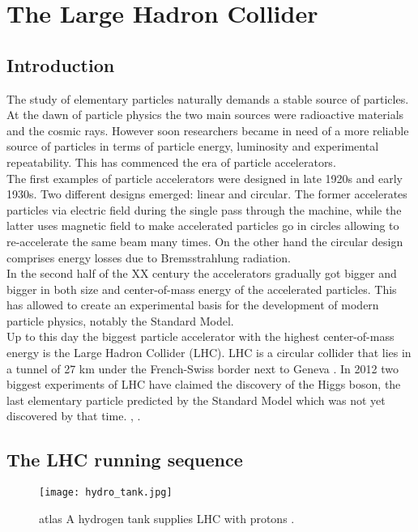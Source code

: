 \chapter{The Large Hadron Collider}
    
   
        
    \section{Introduction}
    
        The study of elementary particles naturally demands a stable source of particles. At the dawn of particle physics the two main sources were radioactive materials and the cosmic rays. However soon researchers became in need of a more reliable source of particles in terms of particle energy, luminosity and experimental repeatability. This has commenced the era of particle accelerators.\\
        The first examples of particle accelerators were designed in late 1920s and early 1930s. Two different designs emerged: linear and circular. The former accelerates particles via electric field during the single pass through the machine, while the latter uses magnetic field to make accelerated particles go in circles allowing to re-accelerate the same beam many times. On the other hand the circular design comprises energy losses due to Bremsstrahlung radiation.\\
        In the second half of the XX century the accelerators gradually got bigger and bigger in both size and center-of-mass energy of the accelerated particles. This has allowed to create an experimental basis for the development of modern particle physics, notably the Standard Model.\\
        Up to this day the biggest particle accelerator with the highest center-of-mass energy is the Large Hadron Collider (LHC). LHC is a circular collider that lies in a tunnel of 27 km under the French-Swiss border next to Geneva \cite{Bruening}. In 2012 two biggest experiments of LHC have claimed the discovery of the Higgs boson, the last elementary particle predicted by the Standard Model which was not yet discovered by that time. \cite{higgs_atlas}, \cite{higgs_cms}.
        
        \section{The LHC running sequence}
                   \begin{figure}[htpb]
        	\texttt{[image: hydro\_tank.jpg]}
        	\caption{ \gls{atlas} A hydrogen tank supplies LHC with protons \cite{hydro}.}
        	\label{fig::hydro}
        \end{figure}
        	
